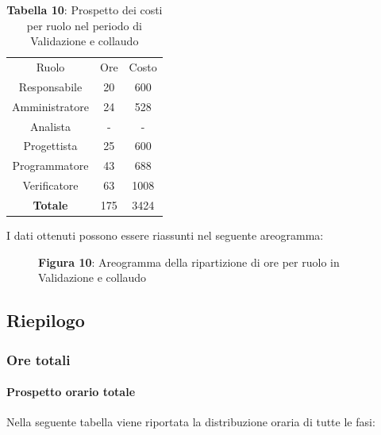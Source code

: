 \begin{table}[H]
	\centering
	\renewcommand{\arraystretch}{1.5}
	\begin{tabular}{|c|c|c|}
		\hline
		\rowcolor{lighter-grayer}
		Ruolo & Ore & Costo \\
Responsabile   & 20  & 600  \\ \hline
Amministratore & 24  & 528  \\ \hline
Analista       & - & - \\ \hline
Progettista    & 25  & 600  \\ \hline
Programmatore  & 43  & 688  \\ \hline
Verificatore   & 63  & 1008 \\ \hline
\textbf{Totale}& 175 & 3424 \\ \hline
	\end{tabular}
\caption*{\textbf{Tabella 10}: Prospetto dei costi per ruolo nel periodo di Validazione e collaudo\\}
\end{table}

I dati ottenuti possono essere riassunti nel seguente areogramma:


\begin{figure}[H]
	\centering
	\caption*{\textbf{Figura 10}: Areogramma della ripartizione di ore per ruolo in Validazione e collaudo}
	\label{fig:Figura10}
\end{figure}

\subsection{Riepilogo}
\subsubsection{Ore totali}
\paragraph{Prospetto orario totale}
Nella seguente tabella viene riportata la distribuzione oraria di tutte le fasi:

